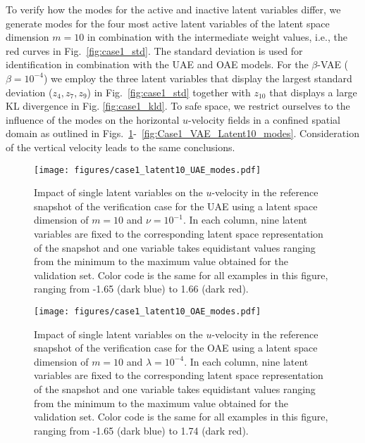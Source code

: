 \smallskip
To verify how the modes for the active and inactive latent variables differ, we  generate modes for the four most active latent variables of the latent space dimension $m=10$ in combination with the intermediate weight values, i.e., the red curves in Fig.~\ref{fig:case1_std}. The standard deviation is used for identification in combination with the UAE and OAE models. For the $\beta$-VAE ($\beta=10^{-4}$) we employ the three latent variables that display the largest standard deviation ($z_4, z_7, z_9$) in Fig.~\ref{fig:case1_std} together with $z_{10}$ that displays a large KL divergence in Fig. \ref{fig:case1_kld}.  
%
To safe space, we restrict ourselves to the influence of the modes on the horizontal $u$-velocity fields in a confined spatial domain as outlined in Figs.~\ref{fig:Case1_UAE_Latent10_modes}-~\ref{fig:Case1_VAE_Latent10_modes}. Consideration of the vertical velocity leads to the same conclusions.


\begin{figure}[h!]
    \centering
    \texttt{[image: figures/case1\_latent10\_UAE\_modes.pdf]}
    \caption{Impact of single latent variables on the $u$-velocity in the reference snapshot of the verification case for the UAE using a latent space dimension of $m=10$ and $\nu=10^{-1}$.  
    In each column, nine latent variables are fixed to the corresponding latent space representation of the snapshot and one variable takes equidistant values ranging from the minimum to the maximum value obtained
    for the validation set.
    Color code is the same for all examples in this figure, ranging from -1.65 (dark blue) to 1.66 (dark red).}
    \label{fig:Case1_UAE_Latent10_modes}
\end{figure}

\begin{figure}[h!]
    \centering
    \texttt{[image: figures/case1\_latent10\_OAE\_modes.pdf]}
    \caption{Impact of single latent variables on the $u$-velocity in the reference snapshot  of the verification case for the OAE using a latent space dimension of $m=10$ and $\lambda=10^{-4}$. 
    In each column, nine latent variables are fixed to the corresponding latent space representation of the snapshot and one variable takes equidistant values ranging from the minimum to the maximum value obtained
    for the validation set.
    Color code is the same for all examples in this figure, ranging from -1.65 (dark blue) to 1.74 (dark red).}
    \label{fig:Case1_OAE_Latent10_modes}
\end{figure}


